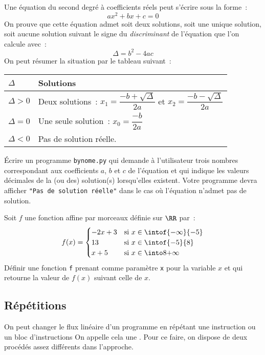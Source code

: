 \begin{exercice}
Une équation du second degré à coefficients réels peut s'écrire sous la forme~:
\[ax^2+bx+c=0\]
On prouve que cette équation admet soit deux solutions, soit une unique solution, soit aucune
solution suivant le signe du \textit{discriminant} de l'équation que l'on calcule avec~:
\[\Delta = b^2-4ac\]
On peut résumer la situation par le tableau suivant~:
\begin{center}
\tabulinesep=1.5mm
\begin{tabu}to0.9\linewidth{|X[1,c]|X[3,l]|}
\hline
{} $\Delta$ & Solutions \\
\hline
$\Delta > 0$ & Deux solutions~: $x_1=\dfrac{-b+\sqrt{\Delta}}{2a}$ et $x_2=\dfrac{-b-\sqrt{\Delta}}{2a}$\\
$\Delta = 0$ & Une seule solution~: $x_0=\dfrac{-b}{2a}$\\
$\Delta < 0$ & Pas de solution réelle. \\
\hline
\end{tabu}
\end{center}
Écrire un programme \texttt{bynome.py} qui demande à l'utilisateur trois nombres correspondant aux
coefficients $a$, $b$ et $c$ de l'équation et qui indique les valeurs décimales de la (ou des)
solution(s) lorsqu'elles existent. Votre programme devra afficher \texttt{"Pas de solution réelle"}
 dans le cas où l'équation n'admet pas de solution.
\end{exercice}

\begin{exercice}
Soit $f$ une fonction affine par morceaux définie sur $\RR$ par~:
\[f(x)=
\begin{cases}
-2x+3 & \text{si } x\in\intof{-\infty}{-5}\\
13 & \text{si } x\in\intof{-5}{8}\\
x+5 & \text{si } x\in\into8{+\infty}
\end{cases}
\]
Définir une fonction \texttt{f} prenant comme paramètre \texttt{x} pour la variable $x$ et
qui retourne la valeur de $f(x)$ suivant celle de $x$.
\end{exercice}




\subsection{Répétitions}
On peut changer le flux linéaire d'un programme en répétant une instruction ou un bloc d'instructions
On appelle cela une . Pour ce faire, on dispose de deux procédés assez différents
dans l'approche.


